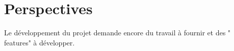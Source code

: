 \section{Perspectives}
Le développement du projet demande encore du travail à fournir et des " features" à développer.